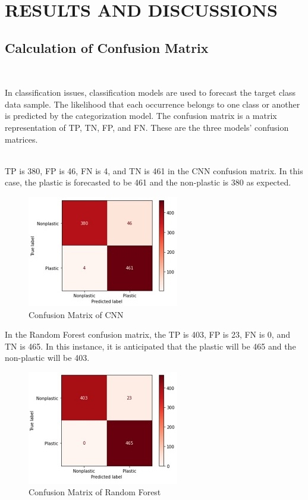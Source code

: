 \chapter{RESULTS AND DISCUSSIONS}
\thispagestyle{empty}
\onehalfspacing
\pagestyle{fancy}
\fancyhf{}
\fancyhead[LE,RO]{\textit{\footnotesize \thepage}}
 
\renewcommand{\headrulewidth}{2pt}
\renewcommand{\footrulewidth}{1pt}
\section{Calculation of Confusion Matrix}\\
\par In classification issues, classification models are used to forecast the target class data sample. The likelihood that each occurrence belongs to one class or another is predicted by the categorization model. The confusion matrix is a matrix representation of TP, TN, FP, and FN. These are the three models' confusion matrices.\\\\
\par TP is 380, FP is 46, FN is 4, and TN is 461 in the CNN confusion matrix. In this case, the plastic is forecasted to be 461 and the non-plastic is 380 as expected.
\begin{figure}
    \centering
    \includegraphics{cnn-cm1.jpg}
    \caption{Confusion Matrix of CNN}
    \label{Confusion Matrix of CNN}
\end{figure}
\par In the Random Forest confusion matrix, the TP is 403, FP is 23, FN is 0, and TN is 465. In this instance, it is anticipated that the plastic will be 465 and the non-plastic will be 403.
\begin{figure}
    \centering
    \includegraphics{rf-cm1.jpg}
    \caption{Confusion Matrix of Random Forest}
    \label{Confusion Matrix of Random Forest}
\end{figure}
